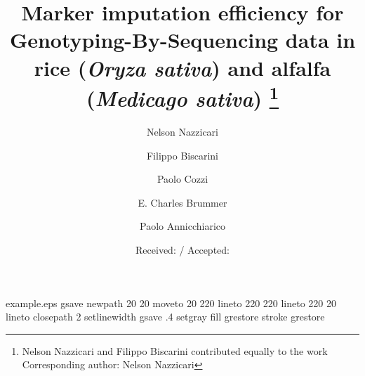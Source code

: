 \begin{filecontents*}{example.eps}
gsave
newpath
  20 20 moveto
  20 220 lineto
  220 220 lineto
  220 20 lineto
closepath
2 setlinewidth
gsave
  .4 setgray fill
grestore
stroke
grestore
\end{filecontents*}
\RequirePackage{fix-cm}
\documentclass[smallextended]{svjour3}       \smartqed  
\usepackage{xfrac}   
\usepackage{lineno}  
\usepackage{graphicx}
\usepackage{color}
\usepackage{multirow}
\usepackage{array}
\usepackage{setspace} 
\usepackage{makecell}
\usepackage[nomarkers]{endfloat}

\newcolumntype{C}[1]{>{\centering\let\newline\\\arraybackslash\hspace{0pt}}m{#1}}
\newcommand{\specialcell}[2][c]{%
  \begin{tabular}[#1]{@{}c@{}}#2\end{tabular}}

\linenumbers
\doublespacing 
{}


\title{
Marker imputation efficiency for Genotyping-By-Sequencing data in rice (\emph{Oryza sativa}) and alfalfa (\emph{Medicago sativa})
\thanks{Nelson Nazzicari and Filippo Biscarini contributed equally to the work \\
Corresponding author: Nelson Nazzicari }
}


\author{Nelson Nazzicari \and
  Filippo Biscarini  \and
  Paolo Cozzi \and
  E. Charles Brummer \and
  Paolo Annicchiarico
}



\date{Received:  / Accepted:}

\maketitle

